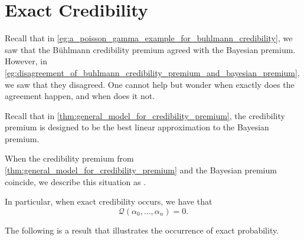 \documentclass[notoc,notitlepage]{tufte-book}
\begin{document}

\newpage
\section{Exact Credibility}%
\label{sec:exact_credibility}


Recall that in \cref{eg:a_poisson_gamma_example_for_buhlmann_credibility},
we saw that the B\"{u}hlmann credibility premium agreed with
the Bayesian premium. However, in
\cref{eg:disagreement_of_buhlmann_credibility_premium_and_bayesian_premium},
we saw that they disagreed.
One cannot help but wonder when exactly does the agreement happen,
and when does it not.

Recall that in \cref{thm:general_model_for_credibility_premium},
the credibility premium is designed to be the best linear approximation
to the Bayesian premium.

\begin{defn}\label{defn:exact_credibility}
  When the credibility premium from
  \cref{thm:general_model_for_credibility_premium}
  and the Bayesian premium coincide, we describe this situation as
  .
\end{defn}

\begin{note}
  In particular, when exact credibility occurs, we have that
  \begin{equation*}
    \mathcal{Q}(\alpha_0, \ldots, \alpha_n) = 0.
  \end{equation*}
\end{note}

The following is a result that illustrates the occurrence of exact probability.
\end{document}

